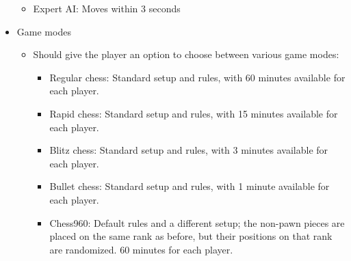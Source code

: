 \documentclass{article}
\begin{document}
\begin{flushleft}
\begin{itemize}
\begin{itemize}
		\item Expert AI: Moves within 3 seconds
	\end{itemize}
	\item Game modes
	\begin{itemize}
		\item Should give the player an option to choose between various game modes:
		\begin{itemize}
			\item Regular chess: Standard setup and rules, with 60 minutes available for each player.
			\item Rapid chess: Standard setup and rules, with 15 minutes available for each player.
			\item Blitz chess: Standard setup and rules, with 3 minutes available for each player.
			\item Bullet chess: Standard setup and rules, with 1 minute available for each player.
			\item Chess960: Default rules and a different setup; the non-pawn pieces are placed on the same rank as before, but their positions on that rank are randomized. 60 minutes for each player.
		\end{itemize}
	\end{itemize}
\end{itemize}

\newpage


\end{flushleft}
\end{document}
